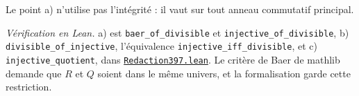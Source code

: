 \noindent Le point a) n'utilise pas l'intégrité : il vaut sur tout anneau commutatif principal.

\begin{sloppypar}
\noindent\emph{Vérification en Lean.} a) est \texttt{baer\_of\_divisible} et \texttt{injective\_of\_divisible}, b) \texttt{divisible\_of\_injective}, l'équivalence \texttt{injective\_iff\_divisible}, et c) \texttt{injective\_quotient}, dans \href{\leanblobmain/Redaction397.lean}{\texttt{Redaction397.\allowbreak{}lean}}. Le critère de Baer de mathlib demande que $R$ et $Q$ soient dans le même univers, et la formalisation garde cette restriction.
\end{sloppypar}

